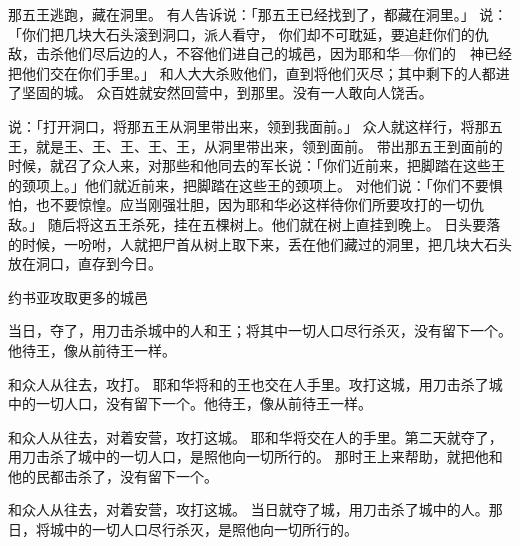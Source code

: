 {\par }{\PP {}那五王逃跑，藏在{}洞里。
有人告诉{}说：「那五王已经找到了，都藏在{}洞里。」
说：「你们把几块大石头滚到洞口，派人看守，
你们却不可耽延，要追赶你们的仇敌，击杀他们尽后边的人，不容他们进自己的城邑，因为耶和华—你们的　神已经把他们交在你们手里。」
和{}人大大杀败他们，直到将他们灭尽；其中剩下的人都进了坚固的城。
众百姓就安然回{}营中，到{}那里。没有一人敢向{}人饶舌。
\par }{\PP {}说：「打开洞口，将那五王从洞里带出来，领到我面前。」
众人就这样行，将那五王，就是{}王、{}王、{}王、{}王、{}王，从洞里带出来，领到{}面前。
带出那五王到{}面前的时候，{}就召了{}众人来，对那些和他同去的军长说：「你们近前来，把脚踏在这些王的颈项上。」他们就近前来，把脚踏在这些王的颈项上。
对他们说：「你们不要惧怕，也不要惊惶。应当刚强壮胆，因为耶和华必这样待你们所要攻打的一切仇敌。」
随后{}将这五王杀死，挂在五棵树上。他们就在树上直挂到晚上。
日头要落的时候，{}一吩咐，人就把尸首从树上取下来，丢在他们藏过的洞里，把几块大石头放在洞口，直存到今日。
\par }{\SH 约书亚攻取更多的城邑
\par }{\PP {}当日，{}夺了{}，用刀击杀城中的人和王；将其中一切人口尽行杀灭，没有留下一个。他待{}王，像从前待{}王一样。
\par }{\PP {}和{}众人从{}往{}去，攻打{}。
耶和华将{}和{}的王也交在{}人手里。{}攻打这城，用刀击杀了城中的一切人口，没有留下一个。他待{}王，像从前待{}王一样。
\par }{\PP {}和{}众人从{}往{}去，对着{}安营，攻打这城。
耶和华将{}交在{}人的手里。第二天{}就夺了{}，用刀击杀了城中的一切人口，是照他向{}一切所行的。
那时{}王{}上来帮助{}，{}就把他和他的民都击杀了，没有留下一个。
\par }{\PP {}和{}众人从{}往{}去，对着{}安营，攻打这城。
当日就夺了城，用刀击杀了城中的人。那日，{}将城中的一切人口尽行杀灭，是照他向{}一切所行的。
}
